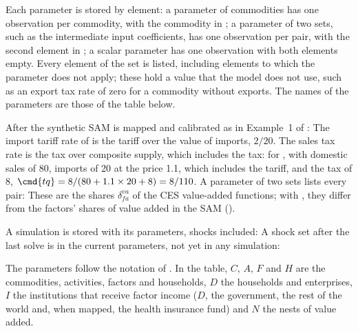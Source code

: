 
Each parameter is stored by element: a parameter of commodities has one
observation per commodity, with the commodity in ; a parameter of
two sets, such as the intermediate input coefficients, has one observation per
pair, with the second element in ; a scalar parameter has one
observation with both elements empty. Every element of the set is listed,
including elements to which the parameter does not apply; these hold a value
that the model does not use, such as an export tax rate of zero for a
commodity without exports. The names of the parameters are those of the table
below.


After the synthetic SAM is mapped and calibrated as in Example~1 of
:
The import tariff rate of  is the tariff over the value of
imports, $2/20$. The sales tax rate is the tax over composite supply, which
includes the tax: for , with domestic sales of 80, imports of 20
at the price 1.1, which includes the tariff, and the tax of 8,
$\cmd{tq} = 8/(80 + 1.1 \times 20 + 8) = 8/110$.
A parameter of two sets lists every pair:
These are the shares $\delta^{va}_{fa}$ of the CES value-added functions;
with , they differ from the factors' shares of value added in
the SAM ().


A simulation is stored with its parameters, shocks included:
A shock set after the last solve is in the current parameters, not yet in any
simulation:


The parameters follow the notation of . In the table,
$C$, $A$, $F$ and $H$ are the commodities, activities, factors and households,
$D$ the households and enterprises, $I$ the institutions that receive factor
income ($D$, the government, the rest of the world and, when mapped, the
health insurance fund) and $N$ the nests of value added.

